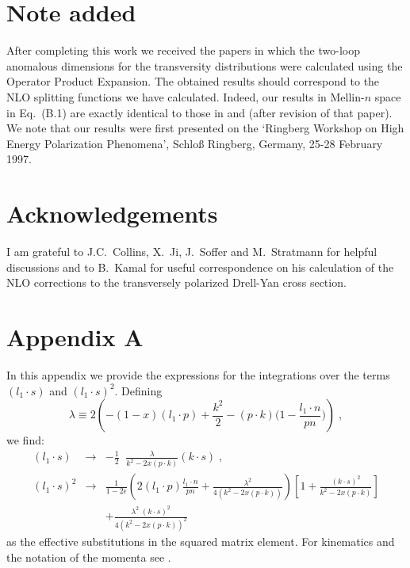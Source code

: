 \section*{Note added}
After completing this work we received the papers \cite{new1,new2} in which 
the two-loop anomalous dimensions for the transversity distributions were
calculated using the Operator Product Expansion. The obtained results should 
correspond to the NLO splitting functions we have calculated. Indeed, 
our results in Mellin-$n$ space in Eq.~(B.1) are exactly identical to
those in \cite{new2} and \cite{new1} (after revision of that paper).
We note that our results were first presented on the `Ringberg Workshop on 
High Energy Polarization Phenomena', Schlo{\ss} Ringberg, Germany,
25-28 February 1997.
\section*{Acknowledgements}
I am grateful to J.C.\ Collins, X.\ Ji, J.\ Soffer and M.\ Stratmann 
for helpful discussions and to B.\ Kamal for useful correspondence on his 
calculation of the NLO corrections to the transversely polarized Drell-Yan 
cross section.
\section*{Appendix A}
\appendix
\setcounter{equation}{0}
\renewcommand{\theequation}{A.\arabic{equation}}
In this appendix we provide the expressions for the integrations over
the terms $(l_1 \cdot s)$ and $(l_1 \cdot s)^2$. Defining 
\begin{equation}
\lambda \equiv 2 \left( -(1-x) (l_1 \cdot p)+\frac{k^2}{2} - (p\cdot k)
\Bigg( 1-\frac{l_1 \cdot n}{pn} \Bigg) \right) \; , 
\end{equation}
we find:
\begin{eqnarray}
(l_1 \cdot s) &\rightarrow& -\frac{1}{2} \; \; 
\frac{\lambda}{k^2-2 x (p\cdot k)} (k \cdot s) \; , \\
(l_1 \cdot s)^2 &\rightarrow& \frac{1}{1-2 \epsilon} \left( 2 (l_1 \cdot p)
\frac{l_1 \cdot n}{pn} + \frac{\lambda^2}{4 (k^2-2 x (p\cdot k))}\right)
\left[ 1+ \frac{(k\cdot s)^2}{k^2-2 x (p\cdot k)} \right] \nonumber \\
&&+\frac{\lambda^2 \; (k\cdot s)^2}{4 (k^2-2 x (p\cdot k))^2} 
\end{eqnarray}
as the effective substitutions in the squared matrix element. For kinematics
and the notation of the momenta see \cite{wv}.
